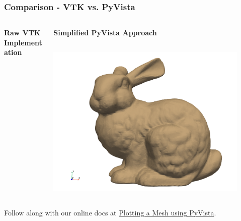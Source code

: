 \documentclass[t]{beamer}
\begin{document}
\begin{frame}
    \frametitle{Comparison - VTK vs. PyVista}

    \vspace{15pt}

    \begin{columns}[T]
        \begin{column}{.5\textwidth}
            \textbf{Raw VTK Implementation} \\[5pt]
            \inputminted[fontsize=\tiny]{python}{code/vtk_example.py}
        \end{column}

        \begin{column}{.5\textwidth}
            \textbf{Simplified PyVista Approach} \\[5pt]
            \inputminted[fontsize=\tiny]{python}{code/pv_example.py}
            \begin{center}
                \includegraphics[width=0.9\textwidth]{figures/pv_example_trans.png}
            \end{center}
        \end{column}
    \end{columns}

    \vspace{15pt}

    Follow along with our online docs at \href{https://dev.pyvista.org/getting-started/why}{Plotting a Mesh using PyVista}.

\end{frame}
\end{document}
